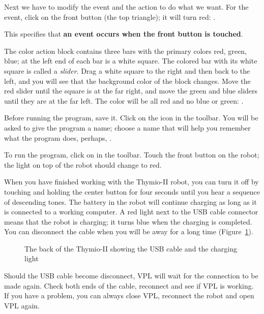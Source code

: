 Next we have to modify the event and the action to do what we want. For
the event, click on the front button (the top triangle); it will turn
red: .

This specifies that \textbf{an event occurs when the front button is touched}.

The color action block contains three bars with the primary colors red,
green, blue; at the left end of each bar is a white square. The colored
bar with its white square is called a \emph{slider}. Drag a white square
to the right and then back to the left, and you will see that the
background color of the block changes. Move the red slider until the
square is at the far right, and move the green and blue sliders until
they are at the far left. The color will be all red and no blue or
green: .


Before running the program, save it. Click on the icon 
in the toolbar. You will be asked to give the program a name; choose a
name that will help you remember what the program does, perhaps,
.


To run the program, click on  in the toolbar. Touch
the front button on the robot; the light on top of the robot should
change to red.


When you have finished working with the Thymio-II robot, you can turn it
off by touching and holding the center button for four seconds until
you hear a sequence of descending tones. The battery in the robot will
continue charging as long as it is connected to a working computer. A
red light next to the USB cable connector means that the robot is
charging; it turns blue when the charging is completed. You can
disconnect the cable when you will be away for a long time
(Figure~\ref{fig.back}).

\begin{figure}
\begin{center}
\caption{The back of the Thymio-II showing the USB cable and the
 charging light}\label{fig.back}
\end{center}
\end{figure}

Should the USB cable become disconnect, VPL will wait for the connection
to be made again. Check both ends of the cable, reconnect and see if VPL
is working. If you have a problem, you can always close VPL, reconnect
the robot and open VPL again.


